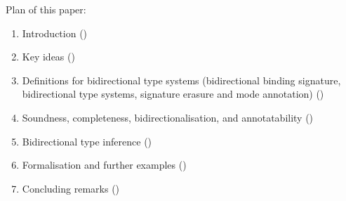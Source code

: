 Plan of this paper:
\begin{enumerate}
  \item Introduction () 
  \item Key ideas ()
  \item Definitions for bidirectional type systems (bidirectional binding signature, bidirectional type systems, signature erasure and mode annotation) ()
  \item Soundness, completeness, bidirectionalisation, and annotatability ()
  \item Bidirectional type inference ()
  \item Formalisation and further examples ()
  \item Concluding remarks ()
     
\end{enumerate}




